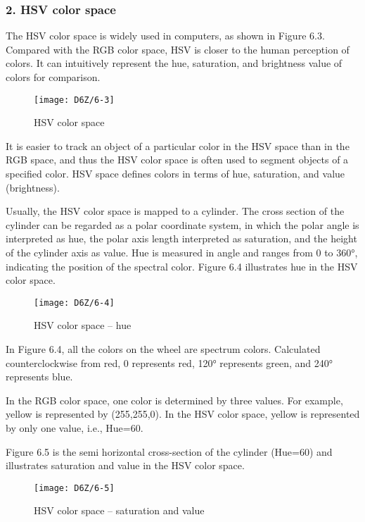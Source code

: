 \documentclass[a4paper,12pt]{book}
\begin{document}
\subsubsection{2. HSV color space}
The HSV color space is widely used in computers, as shown in Figure 6.3. Compared with the RGB color space, HSV is closer to the human perception of colors. It can intuitively represent the hue, saturation, and brightness value of colors for comparison.

\begin{figure}[h!]
    \centering
    \texttt{[image: D6Z/6-3]}
    \caption{HSV color space}
\end{figure}

It is easier to track an object of a particular color in the HSV space than in the RGB space, and thus the HSV color space is often used to segment objects of a specified color. HSV space defines colors in terms of hue, saturation, and value (brightness).

Usually, the HSV color space is mapped to a cylinder. The cross section of the cylinder can be regarded as a polar coordinate system, in which the polar angle is interpreted as hue, the polar axis length interpreted as saturation, and the height of the cylinder axis as value. Hue is measured in angle and ranges from 0 to 360°, indicating the position of the spectral color. Figure 6.4 illustrates hue in the HSV color space.

\begin{figure}[h!]
    \centering
    \texttt{[image: D6Z/6-4]}
    \caption{HSV color space – hue}
\end{figure}

In Figure 6.4, all the colors on the wheel are spectrum colors. Calculated counterclockwise from red, 0 represents red, 120° represents green, and 240° represents blue.

In the RGB color space, one color is determined by three values. For example, yellow is represented by (255,255,0). In the HSV color space, yellow is represented by only one value, i.e., Hue=60.

Figure 6.5 is the semi horizontal cross-section of the cylinder (Hue=60) and illustrates saturation and value in the HSV color space.

\begin{figure}[h!]
    \centering
    \texttt{[image: D6Z/6-5]}
    \caption{HSV color space – saturation and value}
\end{figure}
\end{document}
